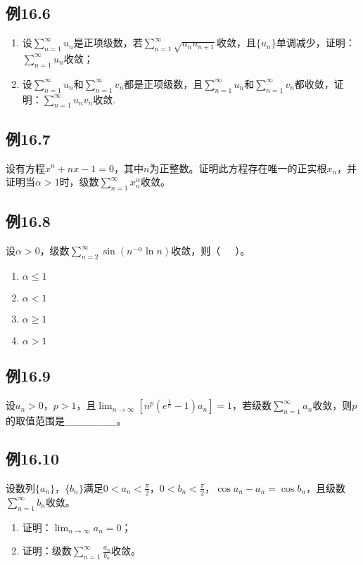 \documentclass[UTF8]{ctexart}
\theoremstyle{remark}
\begin{document}
\begin{multicols}{2}
	\subsection*{例16.6}
	\begin{enumerate}
		\item 设\(\sum_{n = 1}^{\infty}u_n\)是正项级数，若\(\sum_{n = 1}^{\infty}\sqrt{u_nu_{n + 1}}\)收敛，且\(\{u_n\}\)单调减少，证明：\(\sum_{n = 1}^{\infty}u_n\)收敛；
		\item 设\(\sum_{n = 1}^{\infty}u_n\)和\(\sum_{n = 1}^{\infty}v_n\)都是正项级数，且\(\sum_{n = 1}^{\infty}u_n\)和\(\sum_{n = 1}^{\infty}v_n\)都收敛，证明：\(\sum_{n = 1}^{\infty}u_nv_n\)收敛.
	\end{enumerate}
	
	\subsection*{例16.7}
	设有方程\(x^{n}+nx - 1 = 0\)，其中\(n\)为正整数。证明此方程存在唯一的正实根\(x_{n}\)，并证明当\(\alpha>1\)时，级数\(\sum_{n = 1}^{\infty}x_{n}^{\alpha}\)收敛。
	
	\subsection*{例16.8}
	设\(\alpha>0\)，级数\(\sum_{n = 2}^{\infty}\sin(n^{-\alpha}\ln n)\)收敛，则（~~~）。
	\begin{enumerate}[label=(\Alph*)]
		\item \(\alpha\leqslant1\)
		\item \(\alpha<1\)
		\item \(\alpha\geqslant1\)
		\item \(\alpha>1\)
	\end{enumerate}
	
	\subsection*{例16.9}
	设\(a_{n}>0\)，\(p > 1\)，且\(\lim_{n\rightarrow\infty}[n^{p}(e^{\frac{1}{n}} - 1)a_{n}]=1\)，若级数\(\sum_{n = 1}^{\infty}a_{n}\)收敛，则\(p\)的取值范围是\_\_\_\_\_\_\_。
	
	\subsection*{例16.10}
	设数列\(\{a_{n}\}\)，\(\{b_{n}\}\)满足\(0 < a_{n}<\frac{\pi}{2}\)，\(0 < b_{n}<\frac{\pi}{2}\)，\(\cos a_{n}-a_{n}=\cos b_{n}\)，且级数\(\sum_{n = 1}^{\infty}b_{n}\)收敛。
	\begin{enumerate}
		\item 证明：\(\lim_{n\rightarrow\infty}a_{n}=0\)；
		\item 证明：级数\(\sum_{n = 1}^{\infty}\frac{a_{n}}{b_{n}}\)收敛。
	\end{enumerate}
	

\end{multicols}
\end{document}
